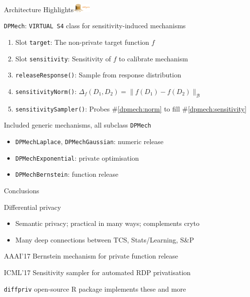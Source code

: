 \documentclass{beamer}
\newcommand{\code}[1]{\texttt{#1}\xspace}
\newcommand{\pck}{\code{diffpriv}}
\newcommand{\cB}{\ensuremath{\mathcal{B}}\xspace}
\begin{document}
\begin{frame}{Architecture Highlights\hfill\includegraphics[height=1.2em]{figures/logo-diffpriv-alert}}

\code{DPMech}: \code{VIRTUAL S4} class for sensitivity-induced mechanisms
\begin{enumerate}
	\item Slot \code{target}: The non-private target function $f$
	\item Slot \code{sensitivity}: Sensitivity of $f$ to calibrate mechanism \label{dpmech:sensitivity}
	\item \code{releaseResponse()}: Sample from response distribution
	\item \code{sensitivityNorm()}: $\Delta_f(D_1,D_2)=\|f(D_1)-f(D_2)\|_{\cB}$ \label{dpmech:norm}
	\item \code{sensitivitySampler()}: Probes \#\ref{dpmech:norm} to fill \#\ref{dpmech:sensitivity}
\end{enumerate}

\pause
Included generic mechanisms, all subclass \code{DPMech}
\begin{itemize}
	\item \code{DPMechLaplace}, \code{DPMechGaussian}: numeric release
	\item \code{DPMechExponential}: private optimisation
	\item \code{DPMechBernstein}: function release
\end{itemize}
\end{frame}

\begin{frame}{Conclusions}

\newcommand{\lb}{\linebreak[4]\vspace{-0.2em}}

Differential privacy 
\begin{itemize}
	\item Semantic privacy; practical in many ways; complements cryto
	\item Many deep connections between TCS, Stats/Learning, S\&P \lb
\end{itemize}

AAAI'17 Bernstein mechanism for private function release \lb

ICML'17 Sensitivity sampler for automated RDP privatisation \lb

\pck open-source R package implements these and more

\end{frame}
\end{document}
